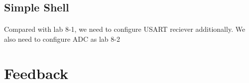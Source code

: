 \subsection{Simple Shell}
\paragraph{}
Compared with lab 8-1, we need to configure USART reciever additionally.
We also need to configure ADC as lab 8-2
\section{Feedback}
\paragraph{}
